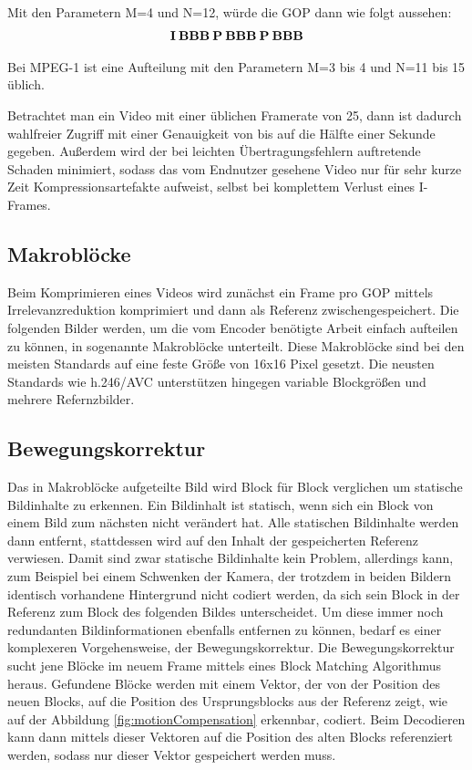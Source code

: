Mit den Parametern M=4 und N=12, würde die GOP dann wie folgt aussehen:
\begin{align*}
\bold{I\:BBB\:P\:BBB\:P\:BBB}
\end{align*}

Bei MPEG-1 ist eine Aufteilung mit den Parametern M=3 bis 4 und N=11 bis 15 üblich. \cite{symes_peter_digital_2004}

Betrachtet man ein Video mit einer üblichen Framerate von 25, dann ist dadurch wahlfreier Zugriff mit einer Genauigkeit von bis auf die Hälfte einer Sekunde gegeben. Außerdem wird der bei leichten Übertragungsfehlern auftretende Schaden minimiert, sodass das vom Endnutzer gesehene Video nur für sehr kurze Zeit Kompressionsartefakte aufweist, selbst bei komplettem Verlust eines I-Frames. 
\subsection{Makroblöcke}
Beim Komprimieren eines Videos wird zunächst ein Frame pro GOP mittels Irrelevanzreduktion komprimiert und dann als Referenz zwischengespeichert. Die folgenden Bilder werden, um die vom Encoder benötigte Arbeit einfach aufteilen zu können, in sogenannte Makroblöcke unterteilt. Diese Makroblöcke sind bei den meisten Standards auf eine feste Größe von 16x16 Pixel gesetzt.\cite{symes_peter_digital_2004} Die neusten Standards wie h.246/AVC unterstützen hingegen variable Blockgrößen und mehrere Refernzbilder. \cite{lin2009vlsi}
\subsection{Bewegungskorrektur}
Das in Makroblöcke aufgeteilte Bild wird Block für Block verglichen um statische Bildinhalte zu erkennen. \cite{symes_peter_digital_2004} Ein Bildinhalt ist statisch, wenn sich ein Block von einem Bild zum nächsten nicht verändert hat. Alle statischen Bildinhalte werden dann entfernt, stattdessen wird auf den Inhalt der gespeicherten Referenz verwiesen. 
Damit sind zwar statische Bildinhalte kein Problem, allerdings kann, zum Beispiel bei einem Schwenken der Kamera, der trotzdem in beiden Bildern identisch vorhandene Hintergrund nicht codiert werden, da sich sein Block in der Referenz zum Block des folgenden Bildes unterscheidet. Um diese immer noch redundanten Bildinformationen ebenfalls entfernen zu können, bedarf es einer komplexeren Vorgehensweise, der Bewegungskorrektur.
Die Bewegungskorrektur sucht jene Blöcke im neuem Frame mittels eines Block Matching Algorithmus heraus. Gefundene Blöcke werden mit einem Vektor, der von der Position des neuen Blocks, auf die Position des Ursprungsblocks aus der Referenz zeigt, wie auf der Abbildung \ref{fig:motionCompensation} erkennbar, codiert.\cite{symes_peter_digital_2004} Beim Decodieren kann dann mittels dieser Vektoren auf die Position des alten Blocks referenziert werden, sodass nur dieser Vektor gespeichert werden muss.
